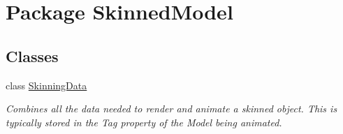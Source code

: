 \hypertarget{namespace_skinned_model}{\section{Package Skinned\+Model}
\label{namespace_skinned_model}
}
\subsection*{Classes}
\begin{DoxyCompactItemize}
\item 
class \hyperlink{class_skinned_model_1_1_skinning_data}{Skinning\+Data}
\begin{DoxyCompactList}\small\item\em Combines all the data needed to render and animate a skinned object. This is typically stored in the Tag property of the Model being animated. \end{DoxyCompactList}\end{DoxyCompactItemize}
